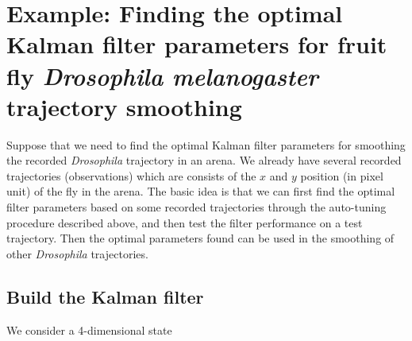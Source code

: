 \section{Example: Finding the optimal Kalman filter parameters for fruit fly \textit{Drosophila melanogaster} trajectory smoothing}

Suppose that we need to find the optimal Kalman filter parameters for smoothing the recorded \textit{Drosophila} 
trajectory in an arena.
We already have several recorded trajectories (observations) which are consists of the $x$ and $y$ position 
(in pixel unit) of the fly in the arena.
The basic idea is that we can first find the optimal filter parameters based on some recorded trajectories 
through the auto-tuning procedure described above, and then test the filter performance on a test trajectory.
Then the optimal parameters found can be used in the smoothing of other \textit{Drosophila} trajectories.

\subsection{Build the Kalman filter}

We consider a 4-dimensional state 